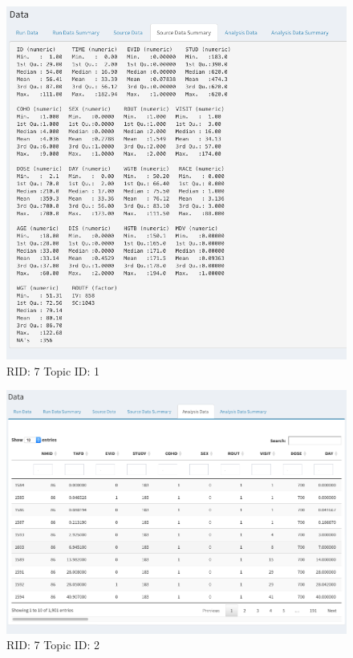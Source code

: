 \documentclass{article}
\begin{document}
\begin{figure}[hp]
\includegraphics[width=.8\textwidth]{screencaps/7-1-2.png}
\caption{RID: 7 Topic ID: 1}
\end{figure}

\begin{figure}[hp]
\includegraphics[width=.8\textwidth]{screencaps/7-2-1.png}
\caption{RID: 7 Topic ID: 2}
\end{figure}
\end{document}
